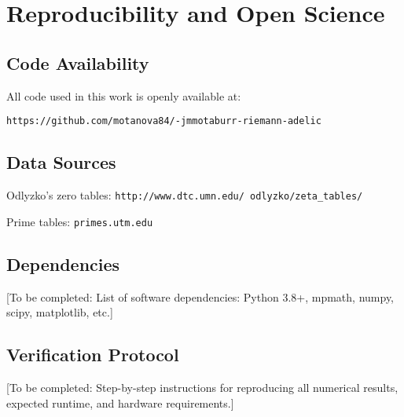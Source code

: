 \section{Reproducibility and Open Science}

\subsection{Code Availability}

All code used in this work is openly available at:
\begin{center}
\texttt{https://github.com/motanova84/-jmmotaburr-riemann-adelic}
\end{center}

\subsection{Data Sources}

Odlyzko's zero tables: \texttt{http://www.dtc.umn.edu/~odlyzko/zeta\_tables/}

Prime tables: \texttt{primes.utm.edu}

\subsection{Dependencies}

[To be completed: List of software dependencies: Python 3.8+, mpmath, numpy, scipy, matplotlib, etc.]

\subsection{Verification Protocol}

[To be completed: Step-by-step instructions for reproducing all numerical results, expected runtime, and hardware requirements.]
